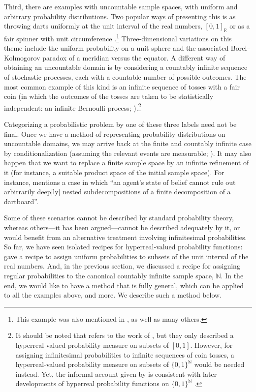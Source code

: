 Third, there are examples with uncountable sample spaces, with uniform and arbitrary probability distributions.
Two popular ways of presenting this is as throwing darts uniformly at the unit interval of the real numbers, $[0,1]_\mathbb{R}$ \citep[\textit{e.g.}, ][]{BernsteinWattenberg:1969} or as a fair spinner with unit circumference \citep[\textit{e.g.}, ][]{Skyrms:1995,Barrett:2010}.\footnote{This example was also mentioned in \citet{Lewis:1980}, as well as many others.} Three-dimensional variations on this theme include the uniform probability on a unit sphere and the associated Borel--Kolmogorov paradox of a meridian versus the equator.
A different way of obtaining an uncountable domain is by considering a countably infinite sequence of stochastic processes, each with a countable number of possible outcomes.
The most common example of this kind is an infinite sequence of tosses with a fair coin (in which the outcomes of the tosses are taken to be statistically independent: an infinite Bernoulli process; \citealp[\textit{e.g.}, ][]{Skyrms:1980,Williamson:2007,Weintraub:2008}).\footnote{It should be noted that \citet{Skyrms:1980} refers to the work of \citet{BernsteinWattenberg:1969}, but they only described a hyperreal-valued probability measure on subsets of $[0,1]$. However, for assigning infinitesimal probabilities to infinite sequences of coin tosses, a hyperreal-valued probability measure on subsets of $\{0,1\}^\mathbb{N}$ would be needed instead. Yet, the informal account given by \citet[pp.~30--31]{Skyrms:1980} is consistent with later developments of hyperreal probability functions on $\{0,1\}^\mathbb{N}$ \citep[see, \textit{e.g.}, ][]{Benci_etal:2013}.}

Categorizing a probabilistic problem by one of these three labels need not be final.
Once we have a method of representing probability distributions on uncountable domains, we may arrive back at the finite and countably infinite case by conditionalization (assuming the relevant events are measurable; \citealp[\textit{cf}.][]{Skyrms:1983a}).
It may also happen that we want to replace a finite sample space by an infinite refinement of it (for instance, a suitable product space of the initial sample space). For instance, \citet[p.~827]{Pedersen:2014a} mentions a case in which ``an agent's state of belief cannot rule out arbitrarily deep[ly] nested subdecompositions of a finite decomposition of a dartboard''.

Some of these scenarios cannot be described by standard probability theory, whereas others---it has been argued---cannot be described adequately by it, or would benefit from an alternative treatment involving infinitesimal probabilities.
So far, we have seen isolated recipes for hyperreal-valued probability functions: \citet{BernsteinWattenberg:1969} gave a recipe to assign uniform probabilities to subsets of the unit interval of the real numbers. And, in the previous section, we discussed a recipe for assigning regular probabilities to the canonical countably infinite sample space, $\mathbb{N}$.
In the end, we would like to have a method that is fully general, which can be applied to all the examples above, and more. We describe such a method below.

